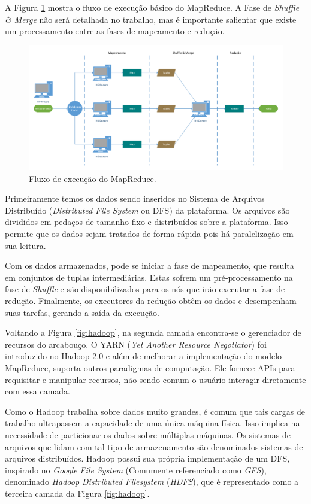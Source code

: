 A Figura \ref{fig:mrworkflow} mostra o fluxo de execução básico do MapReduce. 
A Fase de \textit{Shuffle \& Merge} não será detalhada no trabalho, mas é 
importante salientar que existe um processamento entre as fases de mapeamento e 
redução.

\begin{figure}[ht]
 \centerline{\includegraphics[width=1\textwidth]{./img/mapreduce-workflow.pdf}}
 \caption{Fluxo de execução do MapReduce.}
 \label{fig:mrworkflow}
\end{figure}

Primeiramente temos os dados sendo inseridos no Sistema de Arquivos Distribuído 
(\textit{Distributed File System} ou DFS) da plataforma. Os arquivos são 
divididos em pedaços de tamanho fixo e distribuídos sobre a plataforma. Isso 
permite que os dados sejam tratados de forma rápida pois há paralelização em sua 
leitura.

Com os dados armazenados, pode se iniciar a fase de mapeamento, que resulta em 
conjuntos de tuplas intermediárias. Estas sofrem um pré-processamento na fase 
de \textit{Shuffle} e são disponibilizados para os nós que irão executar a fase 
de redução. Finalmente, os executores da redução obtêm os dados e desempenham 
suas tarefas, gerando a saída da execução.

Voltando a Figura \ref{fig:hadoop}, na segunda camada encontra-se o gerenciador 
de recursos do arcabouço. O YARN (\textit{Yet Another Resource Negotiator}) foi 
introduzido no Hadoop 2.0 e além de melhorar a implementação do modelo 
MapReduce, suporta outros paradigmas de computação. Ele fornece APIs para 
requisitar e manipular recursos, não sendo comum o usuário interagir 
diretamente com essa camada.

Como o Hadoop trabalha sobre dados muito grandes, é comum que tais cargas de 
trabalho ultrapassem a capacidade de uma única máquina física. Isso implica na 
necessidade de particionar os dados sobre múltiplas máquinas. Os sistemas de 
arquivos que lidam com tal tipo de armazenamento são denominados sistemas de 
arquivos distribuídos. Hadoop possui sua própria implementação de um 
DFS, inspirado no \textit{Google File System} (Comumente 
referenciado como \textit{GFS}), denominado \textit{Hadoop Distributed 
Filesystem} (\textit{HDFS}), que é representado como a terceira camada da 
Figura \ref{fig:hadoop}.

